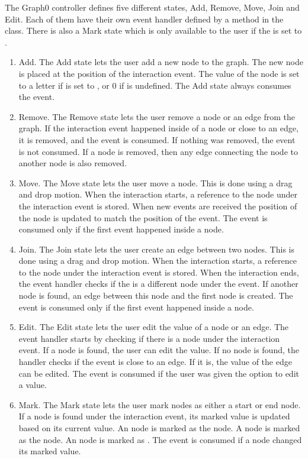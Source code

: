 The Graph0 controller defines five different states, Add, Remove, Move, Join and Edit. Each of them have their own event handler defined by a method in the class. There is also a Mark state which is only available to the user if the  is set to .
\begin{enumerate}
    \item Add. The Add state lets the user add a new node to the graph. The new node is placed at the position of the interaction event. The value of the node is set to a letter if  is set to , or 0 if  is undefined. The Add state always consumes the event. 
    \item Remove. The Remove state lets the user remove a node or an edge from the graph. If the interaction event happened inside of a node or close to an edge, it is removed, and the event is consumed. If nothing was removed, the event is not consumed. If a node is removed, then any edge connecting the node to another node is also removed.
    \item Move. The Move state lets the user move a node. This is done using a drag and drop motion. When the interaction starts, a reference to the node under the interaction event is stored. When new events are received the position of the node is updated to match the position of the event. The event is consumed only if the first event happened inside a node.
    \item Join. The Join state lets the user create an edge between two nodes. This is done using a drag and drop motion. When the interaction starts, a reference to the node under the interaction event is stored. When the interaction ends, the event handler checks if the is a different node under the event. If another node is found, an edge between this node and the first node is created. The event is consumed only if the first event happened inside a node.
    \item Edit. The Edit state lets the user edit the value of a node or an edge. The event handler starts by checking if there is a node under the interaction event. If a node is found, the user can edit the value. If no node is found, the handler checks if the event is close to an edge. If it is, the value of the edge can be edited. The event is consumed if the user was given the option to edit a value.
    \item Mark. The Mark state lets the user mark nodes as either a start or end node. If a node is found under the interaction event, its marked value is updated based on its current value. An  node is marked as the  node. A  node is marked as the  node. An  node is marked as . The event is consumed if a node changed its marked value.
\end{enumerate}
